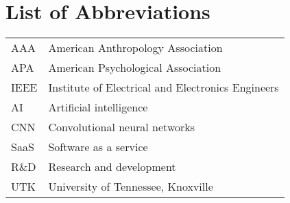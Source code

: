 \chapter*{List of Abbreviations} \label{abbreviations}

\hspace*{-0.6in}
\begin{tabular}{@{}C{1in} L{5.25in}}
    AAA  & American Anthropology Association \\
    APA  & American Psychological Association \\
    IEEE & Institute of Electrical and Electronics Engineers \\
    AI   & Artificial intelligence \\
    CNN  & Convolutional neural networks \\
    SaaS & Software as a service \\
    R\&D & Research and development \\
    UTK  & University of Tennessee, Knoxville \\
\end{tabular}

